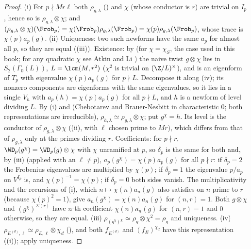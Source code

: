 \begin{proof}
(i) For $p\nmid Mr\ell$ both $\rho_{g,\lambda}$ () and $\chi$ (whose conductor is $r$) are trivial on $I_p$, hence so is $\rho_{g,\lambda}\otimes\chi$; and
$(\rho_{g,\lambda}\otimes\chi)(\Frob_p)=\chi(\Frob_p)\rho_{g,\lambda}(\Frob_p)=\chi(p)\rho_{g,\lambda}(\Frob_p)$, whose trace is $\chi(p)a_p(g)$. (ii) Uniqueness: two such newforms have the same $a_p$ for almost all $p$, so
they are equal ((iii)). Existence: by  (for $\chi=\chi_S$, the case used in this book; for any quadratic $\chi$ see Atkin and Li \cite{AtkinLi78}) the naive
twist $g\otimes\chi$ lies in $S_2(\Gamma_0(L))$, $L=\lcm(M,r^2)$ ($\chi^2$ is trivial on $(\Z/L)^\times$), and is an eigenform of $T_p$ with eigenvalue $\chi(p)a_p(g)$ for $p\nmid L$. Decompose it along
(iv); its nonzero components are eigenforms with the same eigenvalues, so it lies in a single $V_h$ with
$a_p(h)=\chi(p)a_p(g)$ for all $p\nmid L$, and $h$ is a newform of level dividing $L$. By (i) and  (Chebotarev and
Brauer-Nesbitt in characteristic $0$; both representations are irreducible), $\rho_{h,\lambda}\simeq\rho_{g,\lambda}\otimes\chi$; put $g^\chi=h$. Its level is the conductor of
$\rho_{g,\lambda}\otimes\chi$ ((ii), with $\ell$ chosen prime to $Mr$), which differs from that of $\rho_{g,\lambda}$ only at the primes dividing $r$.
Coefficients: for $p\nmid r$, $\WD_p(g^\chi)=\WD_p(g)\otimes\chi$ with $\chi$ unramified at $p$, so $\delta_p$ is the same for both and, by
(iii) (applied with an $\ell\ne p$), $a_p(g^\chi)=\chi(p)a_p(g)$ for all $p\nmid r$: if $\delta_p=2$ the Frobenius eigenvalues are multiplied by
$\chi(p)$; if $\delta_p=1$ the eigenvalue $p/a_p$ on $V^{I_p}$ is, and $\chi(p)^{-1}=\chi(p)$; if $\delta_p=0$ both sides vanish. The multiplicativity and the recursions of
(i), which $n\mapsto\chi(n)a_n(g)$ also satisfies on $n$ prime to $r$ (because $\chi(p)^2=1$), give $a_n(g^\chi)=\chi(n)a_n(g)$ for $(n,r)=1$.
Both $g\otimes\chi$ and $(g^\chi)^{\Sigma(r)}$ have $n$-th coefficient $\chi(n)a_n(g)$ for $(n,r)=1$ and $0$ otherwise, so they are equal. (iii) $\rho_{(g^\chi)^\chi}\simeq\rho_g\otimes\chi^2=\rho_g$
and uniqueness. (iv) $\rho_{E^{(d)},\ell}\simeq\rho_{E,\ell}\otimes\chi_d$ (), and both $f_{E^{(d)}}$ and $(f_E)^{\chi_d}$ have this representation
((i)); apply uniqueness.
\end{proof}


